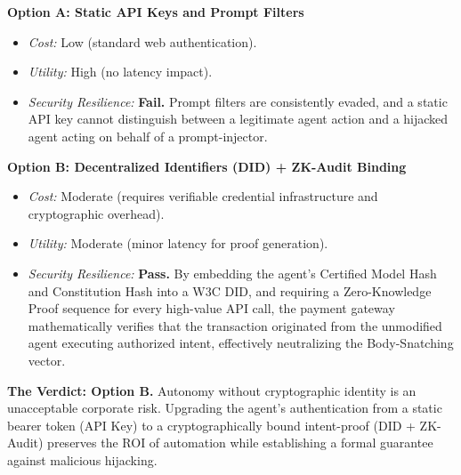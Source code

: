 \begin{tcolorbox}[scorecardbox, title={Sovereign AI Scorecard Evaluation}]
\textbf{Option A: Static API Keys and Prompt Filters}
\begin{itemize}
    \item \textit{Cost:} Low (standard web authentication).
    \item \textit{Utility:} High (no latency impact).
    \item \textit{Security Resilience:} \textbf{Fail.} Prompt filters are consistently evaded, and a static API key cannot distinguish between a legitimate agent action and a hijacked agent acting on behalf of a prompt-injector. 
\end{itemize}

\textbf{Option B: Decentralized Identifiers (DID) + ZK-Audit Binding}
\begin{itemize}
    \item \textit{Cost:} Moderate (requires verifiable credential infrastructure and cryptographic overhead).
    \item \textit{Utility:} Moderate (minor latency for proof generation).
    \item \textit{Security Resilience:} \textbf{Pass.} By embedding the agent's Certified Model Hash and Constitution Hash into a W3C DID, and requiring a Zero-Knowledge Proof sequence for every high-value API call, the payment gateway mathematically verifies that the transaction originated from the unmodified agent executing authorized intent, effectively neutralizing the Body-Snatching vector.
\end{itemize}

\textbf{The Verdict: Option B.} 
Autonomy without cryptographic identity is an unacceptable corporate risk. Upgrading the agent's authentication from a static bearer token (API Key) to a cryptographically bound intent-proof (DID + ZK-Audit) preserves the ROI of automation while establishing a formal guarantee against malicious hijacking. 
\end{tcolorbox}
